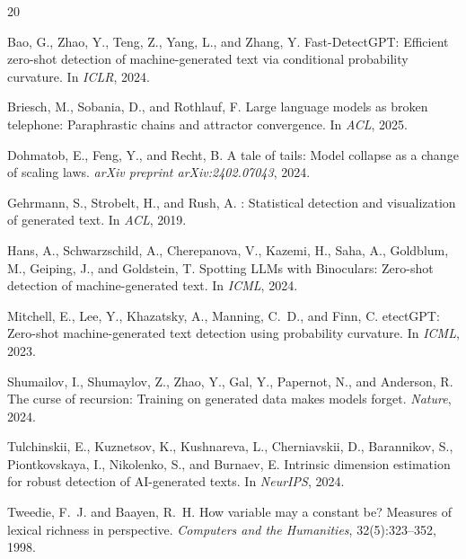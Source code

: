 \documentclass[11pt,a4paper]{article}
\begin{document}
\begin{thebibliography}{20}

Bao, G., Zhao, Y., Teng, Z., Yang, L., and Zhang, Y.
\newblock Fast-{D}etect{GPT}: Efficient zero-shot detection of machine-generated text via conditional probability curvature.
\newblock In \emph{ICLR}, 2024.

Briesch, M., Sobania, D., and Rothlauf, F.
\newblock Large language models as broken telephone: Paraphrastic chains and attractor convergence.
\newblock In \emph{ACL}, 2025.

Dohmatob, E., Feng, Y., and Recht, B.
\newblock A tale of tails: Model collapse as a change of scaling laws.
\newblock \emph{arXiv preprint arXiv:2402.07043}, 2024.

Gehrmann, S., Strobelt, H., and Rush, A.
: Statistical detection and visualization of generated text.
\newblock In \emph{ACL}, 2019.

Hans, A., Schwarzschild, A., Cherepanova, V., Kazemi, H., Saha, A., Goldblum, M., Geiping, J., and Goldstein, T.
\newblock Spotting {LLM}s with {B}inoculars: Zero-shot detection of machine-generated text.
\newblock In \emph{ICML}, 2024.

Mitchell, E., Lee, Y., Khazatsky, A., Manning, C.~D., and Finn, C.
etect{GPT}: Zero-shot machine-generated text detection using probability curvature.
\newblock In \emph{ICML}, 2023.

Shumailov, I., Shumaylov, Z., Zhao, Y., Gal, Y., Papernot, N., and Anderson, R.
\newblock The curse of recursion: Training on generated data makes models forget.
\newblock \emph{Nature}, 2024.

Tulchinskii, E., Kuznetsov, K., Kushnareva, L., Cherniavskii, D., Barannikov, S., Piontkovskaya, I., Nikolenko, S., and Burnaev, E.
\newblock Intrinsic dimension estimation for robust detection of {AI}-generated texts.
\newblock In \emph{NeurIPS}, 2024.

Tweedie, F.~J. and Baayen, R.~H.
\newblock How variable may a constant be? {M}easures of lexical richness in perspective.
\newblock \emph{Computers and the Humanities}, 32(5):323--352, 1998.


\end{thebibliography}
\end{document}
